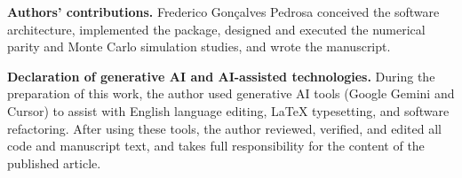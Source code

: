﻿\documentclass[12pt,letterpaper]{article}
\begin{document}
\noindent \textbf{Authors' contributions.} Frederico Gonçalves Pedrosa conceived the software architecture, implemented the package, designed and executed the numerical parity and Monte Carlo simulation studies, and wrote the manuscript.

\noindent \textbf{Declaration of generative AI and AI-assisted technologies.} During the preparation of this work, the author used generative AI tools (Google Gemini and Cursor) to assist with English language editing, \LaTeX{} typesetting, and software refactoring. After using these tools, the author reviewed, verified, and edited all code and manuscript text, and takes full responsibility for the content of the published article.

\printbibliography
\end{document}
